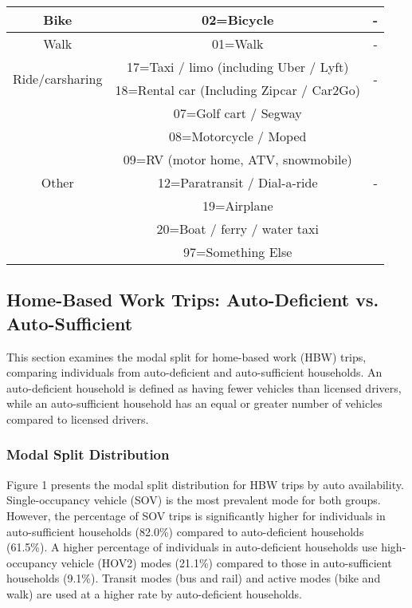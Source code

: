 \begin{table}[h!]
\begin{tabular}{ccc}
        \midrule
        Bike                      & 02=Bicycle        & \--                  \\
        \midrule
        Walk                      & 01=Walk           & \--                  \\
        \midrule
        \multirow{2}{*}{Ride/carsharing} & 17=Taxi / limo (including Uber / Lyft) & \multirow{2}{*}{\--} \\
                                  & 18=Rental car (Including Zipcar / Car2Go) &                     \\
        \midrule
        \multirow{7}{*}{Other}    & 07=Golf cart / Segway & \multirow{7}{*}{\--} \\
                                  & 08=Motorcycle / Moped &                     \\
                                  & 09=RV (motor home, ATV, snowmobile) &                     \\
                                  & 12=Paratransit / Dial-a-ride &                     \\
                                  & 19=Airplane         &                     \\
                                  & 20=Boat / ferry / water taxi &                     \\
                                  & 97=Something Else   &                     \\
        \bottomrule
    \end{tabular}
\end{table}

\subsection{Home-Based Work Trips: Auto-Deficient vs. Auto-Sufficient}

This section examines the modal split for home-based work (HBW) trips, comparing individuals from auto-deficient and auto-sufficient households. An auto-deficient household is defined as having fewer vehicles than licensed drivers, while an auto-sufficient household has an equal or greater number of vehicles compared to licensed drivers. 



\subsubsection{Modal Split Distribution}

\par{Figure 1 presents the modal split distribution for HBW trips by auto availability. Single-occupancy vehicle (SOV) is the most prevalent mode for both groups. However, the percentage of SOV trips is significantly higher for individuals in auto-sufficient households (82.0\%) compared to auto-deficient households (61.5\%). A higher percentage of individuals in auto-deficient households use high-occupancy vehicle (HOV2) modes (21.1\%) compared to those in auto-sufficient households (9.1\%). Transit modes (bus and rail) and active modes (bike and walk) are used at a higher rate by auto-deficient households.}

